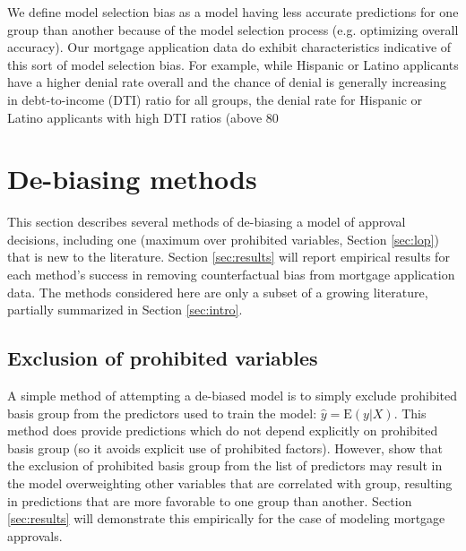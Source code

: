 We define model selection bias as a model having less accurate predictions for one group than another because of the model selection process (e.g. optimizing overall accuracy). Our mortgage application data do exhibit characteristics indicative of this sort of model selection bias. For example, while Hispanic or Latino applicants have a higher denial rate overall and the chance of denial is generally increasing in debt-to-income (DTI) ratio for all groups, the denial rate for Hispanic or Latino applicants with high DTI ratios (above 80\
\section{De-biasing methods}\label{sec:methods}
This section describes several methods of de-biasing a model of approval decisions, including one (maximum over prohibited variables, Section \ref{sec:lop}) that is new to the literature. Section \ref{sec:results} will report empirical results for each method's success in removing counterfactual bias from mortgage application data. The methods considered here are only a subset of a growing literature, partially summarized in Section \ref{sec:intro}.

\subsection{Exclusion of prohibited variables}\label{sec:excluding}
A simple method of attempting a de-biased model is to simply exclude prohibited basis group from the predictors used to train the model: $\hat{y} = \text{E}\left(y\vert X\right)$. This method does provide predictions which do not depend explicitly on prohibited basis group (so it avoids explicit use of prohibited factors). However,  show that the exclusion of prohibited basis group from the list of predictors may result in the model overweighting other variables that are correlated with group, resulting in predictions that are more favorable to one group than another. Section \ref{sec:results} will demonstrate this empirically for the case of modeling mortgage approvals.

